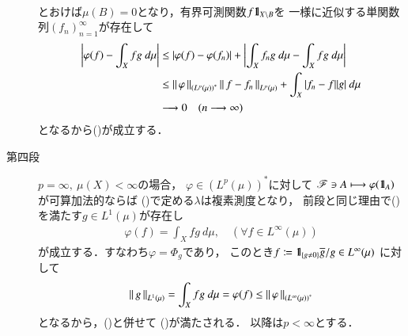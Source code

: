 \begin{prf}
\begin{description}
\begin{align}
				\end{align}
				とおけば$\mu(B) = 0$となり，有界可測関数$f \mbox{1}\hspace{-0.25em}\mbox{l}_{X \backslash B}$を
				一様に近似する単関数列$(f_n)_{n=1}^\infty$が存在して
				\begin{align}
					\left| \varphi(f) - \int_X fg\ d\mu \right|
					&\leq \left| \varphi(f) - \varphi(f_n) \right| + \left| \int_X f_ng\ d\mu - \int_X fg\ d\mu \right| \\
					&\leq \left\|\, \varphi\, \right\|_{\left( L^p(\mu) \right)^*} \left\|\, f - f_n\, \right\|_{L^p(\mu)}
						+ \int_X |f_n - f||g|\ d\mu \\
					&\longrightarrow 0 \quad (n \longrightarrow \infty)
				\end{align}
				となるから()が成立する．
			
			\item[第四段]
				$p = \infty,\ \mu(X) < \infty$の場合，
				$\varphi \in \left( L^p(\mu) \right)^*$に対して
				$\mathscr{F} \ni A \longmapsto \varphi(\mbox{1}\hspace{-0.25em}\mbox{l}_A)$が可算加法的ならば
				()で定める$\lambda$は複素測度となり，
				前段と同じ理由で()を満たす$g \in L^1(\mu)$が存在し
				\begin{align}
					\varphi(f) = \int_X fg\ d\mu,
					\quad (\forall f \in L^\infty(\mu))
				\end{align}
				が成立する．すなわち$\varphi = \Phi_g$であり，
				このとき$f \coloneqq \mbox{1}\hspace{-0.25em}\mbox{l}_{\{g \neq 0\}}\overline{g}/g \in L^\infty(\mu)$
				に対して
				\begin{align}
					\left\|\, g\, \right\|_{L^1(\mu)} = \int_X fg\ d\mu = \varphi(f) 
					\leq \left\|\, \varphi\, \right\|_{\left( L^\infty(\mu) \right)^*} 
				\end{align}
				となるから，()と併せて
				()が満たされる．
				以降は$p < \infty$とする．
				

\end{description}
\end{prf}
